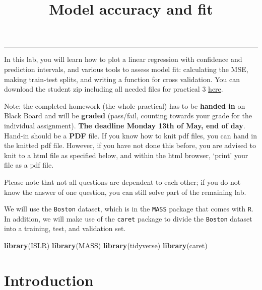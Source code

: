 \documentclass[
  12pt,
]{article}
\title{Model accuracy and fit}
\author{}
\date{\vspace{-2.5em}}
\newenvironment{Shaded}{\begin{snugshade}}{\end{snugshade}}
\newcommand{\FunctionTok}[1]{\textcolor[rgb]{0.13,0.29,0.53}{\textbf{#1}}}
\newcommand{\NormalTok}[1]{#1}
\begin{document}
\maketitle

{
\hypersetup{linkcolor=}
\setcounter{tocdepth}{1}
\tableofcontents
}
\begin{center}\rule{0.5\linewidth}{0.5pt}\end{center}

In this lab, you will learn how to plot a linear regression with
confidence and prediction intervals, and various tools to assess model
fit: calculating the MSE, making train-test splits, and writing a
function for cross validation. You can download the student zip
including all needed files for practical 3
\href{https://surfdrive.surf.nl/files/index.php/s/BcQtVPSdH7bCYZA}{here}.

Note: the completed homework (the whole practical) has to be
\textbf{handed in} on Black Board and will be \textbf{graded}
(pass/fail, counting towards your grade for the individual assignment).
\textbf{The deadline Monday 13th of May, end of day}. Hand-in should be
a \textbf{PDF} file. If you know how to knit pdf files, you can hand in
the knitted pdf file. However, if you have not done this before, you are
advised to knit to a html file as specified below, and within the html
browser, `print' your file as a pdf file.

Please note that not all questions are dependent to each other; if you
do not know the answer of one question, you can still solve part of the
remaining lab.

We will use the \texttt{Boston} dataset, which is in the \texttt{MASS}
package that comes with \texttt{R}. In addition, we will make use of the
\texttt{caret} package to divide the \texttt{Boston} dataset into a
training, test, and validation set.

\begin{Shaded}
\begin{Highlighting}[]
\FunctionTok{library}\NormalTok{(ISLR)}
\FunctionTok{library}\NormalTok{(MASS)}
\FunctionTok{library}\NormalTok{(tidyverse)}
\FunctionTok{library}\NormalTok{(caret)}
\end{Highlighting}
\end{Shaded}

\hypertarget{introduction}{%
\section{Introduction}\label{introduction}}
\end{document}
